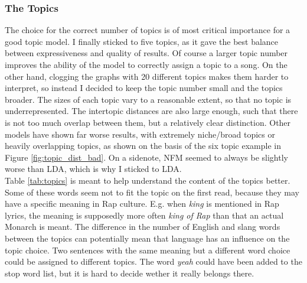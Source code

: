 \documentclass[conference]{IEEEtran}
\begin{document}
\subsubsection{The Topics} \label{discussion_topics}
The choice for the correct number of topics is of most critical importance for a good topic model. I finally sticked to five topics, as it gave the best balance between expressiveness and quality of results. Of course a larger topic number improves the ability of the model to correctly assign a topic to a song. On the other hand, clogging the graphs with 20 different topics makes them harder to interpret, so instead I decided to keep the topic number small and the topics broader. The sizes of each topic vary to a reasonable extent, so that no topic is underrepresented. The intertopic distances are also large enough, such that there is not too much overlap between them, but a relatively clear distinction. Other models have shown far worse results, with extremely niche/broad topics or heavily overlapping topics, as shown on the basis of the six topic example in Figure \ref{fig:topic_dist_bad}. On a sidenote, NFM seemed to always be slightly worse than LDA, which is why I sticked to LDA.\\
Table \ref{tab:topics} is meant to help understand the content of the topics better. Some of these words seem not to fit the topic on the first read, because they may have a specific meaning in Rap culture. E.g. when \textit{king} is mentioned in Rap lyrics, the meaning is supposedly more often \textit{king of Rap} than that an actual Monarch is meant. The difference in the number of English and slang words between the topics can potentially mean that language has an influence on the topic choice. Two sentences with the same meaning but a different word choice could be assigned to different topics. The word \textit{yeah} could have been added to the stop word list, but it is hard to decide wether it really belongs there.
\end{document}
